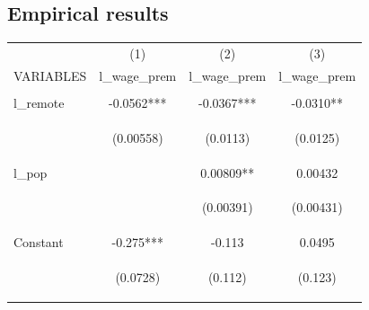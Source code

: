 \documentclass{article}
\begin{document}
\subsection{Empirical results}

\begin{table}
    \centering
    \begin{tabular}{lccc} \hline
     & (1) & (2) & (3) \\
    VARIABLES & l\_wage\_prem & l\_wage\_prem & l\_wage\_prem \\ \hline
    \vspace{4pt} & \begin{footnotesize}\end{footnotesize} & \begin{footnotesize}\end{footnotesize} & \begin{footnotesize}\end{footnotesize} \\
    l\_remote & -0.0562*** & -0.0367*** & -0.0310** \\
    \vspace{4pt} & \begin{footnotesize}(0.00558)\end{footnotesize} & \begin{footnotesize}(0.0113)\end{footnotesize} & \begin{footnotesize}(0.0125)\end{footnotesize} \\
    l\_pop &  & 0.00809** & 0.00432 \\
    \vspace{4pt} & \begin{footnotesize}\end{footnotesize} & \begin{footnotesize}(0.00391)\end{footnotesize} & \begin{footnotesize}(0.00431)\end{footnotesize} \\
    Constant & -0.275*** & -0.113 & 0.0495 \\
     & \begin{footnotesize}(0.0728)\end{footnotesize} & \begin{footnotesize}(0.112)\end{footnotesize} & \begin{footnotesize}(0.123)\end{footnotesize} \\

\end{tabular}
\end{table}
\end{document}
